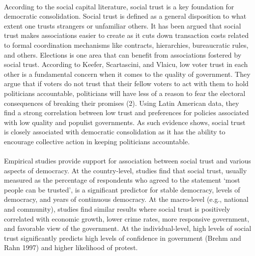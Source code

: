 \documentclass[a4paper, 12pt]{article}
\begin{document}
\paragraph{} 
According to the social capital literature, social trust is a key foundation for democratic consolidation. Social trust is defined as a general disposition to what extent one trusts strangers or unfamiliar others\cite{uslanerSegregationMistrustDiversity2012, uslanerMoralFoundationsTrust2002}. It has been argued that social trust makes associations easier to create as it cuts down transaction costs related to formal coordination mechanisms like contracts, hierarchies, bureaucratic rules, and others\cite{fukuyamaTrustSocialVirtues2000, putnamBowlingAloneAmerica2000, uslanerMoralFoundationsTrust2002, warrenTrustDemocracy2018}. Elections is one area that can benefit from associations fostered by social trust. According to Keefer, Scartascini, and Vlaicu\cite{keeferSocialTrustElectoral2019}, low voter trust in each other is a fundamental concern when it comes to the quality of government. They argue that if voters do not trust that their fellow voters to act with them to hold politicians accountable, politicians will have less of a reason to fear the electoral consequences of breaking their promises\cite{keeferSocialTrustElectoral2019} (2). Using Latin American data, they find a strong correlation between low trust and preferences for policies associated with low quality and populist governments. As such evidence shows, social trust is closely associated with democratic consolidation as it has the ability to encourage collective action in keeping politicians accountable.
\paragraph{}
Empirical studies provide support for association between social trust and various aspects of democracy. At the country-level, studies find that social trust, usually measured as the percentage of respondents who agreed to the statement ‘most people can be trusted’, is a significant predictor for stable democracy, levels of democracy, and years of continuous democracy\cite{inglehartModernizationPostmodernizationCultural1997, inglehartTrustWellbeingDemocracy1999, mullerCivicCultureDemocracy1994b}. At the macro-level (e.g., national and community), studies find similar results where social trust is positively correlated with economic growth\cite{fukuyamaTrustSocialVirtues1995, knackDoesSocialCapital1997, dasguptaSocialCapitalMultifaceted2000}, lower crime rates\cite{jacobsDeathLifeGreat1992, wilsonTrulyDisadvantagedInner2012}, more responsive government\cite{putnamWhatMakesDemocracy1993}, and favorable view of the government\cite{riceSocialCapitalGovernment2001, knackSocialCapitalQuality2002, laportaQualityGovernment1999}. At the individual-level, high levels of social trust significantly predicts high levels of confidence in government (Brehm and Rahn 1997) and higher likelihood of protest\cite{bensonInterpersonalTrustMagnitude2004}.
\end{document}
